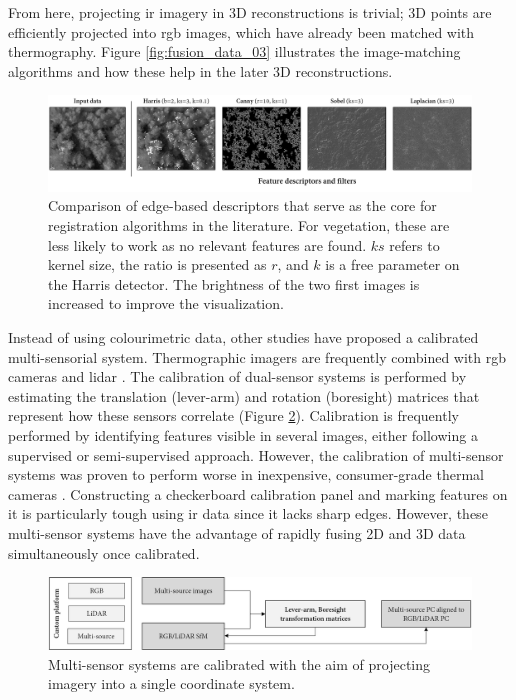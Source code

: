From here, projecting \acrshort{ir} imagery in 3D reconstructions is trivial; 3D points are efficiently projected into \acrshort{rgb} images, which have already been matched with thermography. Figure \ref{fig:fusion_data_03} illustrates the image-matching algorithms and how these help in the later 3D reconstructions. 

\begin{figure}[ht]
	\includegraphics[width=\linewidth]{figs/context/feature_detection.png}
	\caption{Comparison of edge-based descriptors that serve as the core for registration algorithms in the literature. For vegetation, these are less likely to work as no relevant features are found. $\textit{ks}$ refers to kernel size, the ratio is presented as $\textit{r}$, and $\textit{k}$ is a free parameter on the Harris detector. The brightness of the two first images is increased to improve the visualization.}
    \label{fig:feature_detection}
\end{figure}

Instead of using colourimetric data, other studies have proposed a calibrated multi-sensorial system. Thermographic imagers are frequently combined with \acrshort{rgb} cameras \cite{javadnejad_photogrammetric_2020, landmann_multimodal_2019, adan_fusion_2017} and \acrshort{lidar} \cite{adan_fusion_2017, hoegner_fusion_2018}. The calibration of dual-sensor systems is performed by estimating the translation (lever-arm) and rotation (boresight) matrices that represent how these sensors correlate (Figure \ref{fig:fusion_data_04}). Calibration is frequently performed by identifying features visible in several images, either following a supervised or semi-supervised approach. However, the calibration of multi-sensor systems was proven to perform worse in inexpensive, consumer-grade thermal cameras \cite{javadnejad_photogrammetric_2020}. Constructing a checkerboard calibration panel and marking features on it is particularly tough using \acrshort{ir} data \cite{javadnejad_photogrammetric_2020} since it lacks sharp edges. However, these multi-sensor systems have the advantage of rapidly fusing 2D and 3D data simultaneously once calibrated.

\begin{figure}[ht]
	\includegraphics[width=\linewidth]{figs/context/fusion_04.png}
	\caption{Multi-sensor systems are calibrated with the aim of projecting imagery into a single coordinate system.}
    \label{fig:fusion_data_04}
\end{figure}


